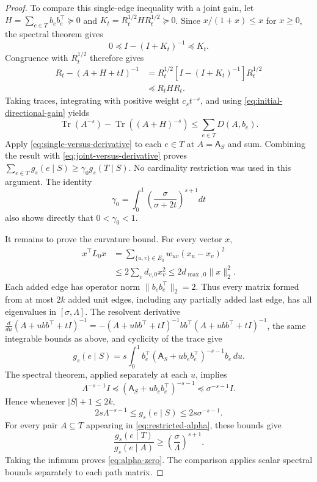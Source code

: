 \documentclass[conference]{IEEEtran}
\theoremstyle{definition}
\DeclareMathOperator{\Tr}{Tr}
\newcommand{\matA}{\mathsf A}
\begin{document}
\begin{proof}
To compare this single-edge inequality with a joint gain, let
$H=\sum_{e\in T}b_eb_e^\top\succeq0$ and
$K_t=R_t^{1/2}HR_t^{1/2}\succeq0$.
Since $x/(1+x)\leq x$ for $x\geq0$, the spectral theorem gives
\[
 0\preceq I-(I+K_t)^{-1}\preceq K_t.
\]
Congruence with $R_t^{1/2}$ therefore gives
\begin{align*}
 R_t-(A+H+t I)^{-1}
 &=R_t^{1/2}[I-(I+K_t)^{-1}]R_t^{1/2}\\
 &\preceq R_t H R_t.
\end{align*}
Taking traces, integrating with positive weight $c_st^{-s}$,
and using \eqref{eq:initial-directional-gain} yields
\begin{equation}
 \Tr(A^{-s})-\Tr((A+H)^{-s})
 \leq\sum_{e\in T}D(A,b_e).
 \label{eq:joint-versus-derivative}
\end{equation}
Apply \eqref{eq:single-versus-derivative} to each $e\in T$ at
$A=\matA_{S}$ and sum.  Combining the result with
\eqref{eq:joint-versus-derivative} proves
$\sum_{e\in T}g_s(e\mid S)\geq\gamma_0g_s(T\mid S)$.
No cardinality restriction was used in this argument.
The identity
\[
 \gamma_0=\int_0^1
              \left(\frac{\sigma}{\sigma+2t}\right)^{s+1}dt
\]
also shows directly that $0<\gamma_0<1$.

It remains to prove the curvature bound.  For every vector $x$,
\begin{align*}
 x^\top L_0x
 &=\sum_{\{u,v\}\in E_0}w_{uv}(x_u-x_v)^2\\
 &\leq2\sum_v d_{v,0}x_v^2
 \leq2d_{\max,0}\|x\|_2^2.
\end{align*}
Each added edge has operator norm
$\|b_eb_e^\top\|_2=2$.  Thus every matrix formed from at most $2k$
added unit edges, including any partially added last edge, has all
eigenvalues in $[\sigma,\Lambda]$.
The resolvent derivative
$\frac{d}{du}(A+ubb^\top+t I)^{-1}
=-(A+ubb^\top+t I)^{-1}bb^\top
  (A+ubb^\top+t I)^{-1}$,
the same integrable bounds as above, and cyclicity of the trace give
\begin{equation}
 g_s(e\mid S)=s\int_0^1
 b_e^\top(\matA_{S}+u b_eb_e^\top)^{-s-1}b_e\,du.
 \label{eq:curvature-path}
\end{equation}
The spectral theorem, applied separately at each $u$, implies
\[
 \Lambda^{-s-1}I\preceq
 (\matA_{S}+u b_eb_e^\top)^{-s-1}
 \preceq\sigma^{-s-1}I.
\]
Hence whenever $|S|+1\leq2k$,
\[
 2s\Lambda^{-s-1}\leq g_s(e\mid S)
                         \leq2s\sigma^{-s-1}.
\]
For every pair $A\subseteq T$ appearing in
\eqref{eq:restricted-alpha}, these bounds give
\[
 \frac{g_s(e\mid T)}{g_s(e\mid A)}
 \geq\left(\frac{\sigma}{\Lambda}\right)^{s+1}.
\]
Taking the infimum proves \eqref{eq:alpha-zero}.
The comparison applies scalar spectral bounds separately to each path matrix.
\end{proof}
\end{document}
